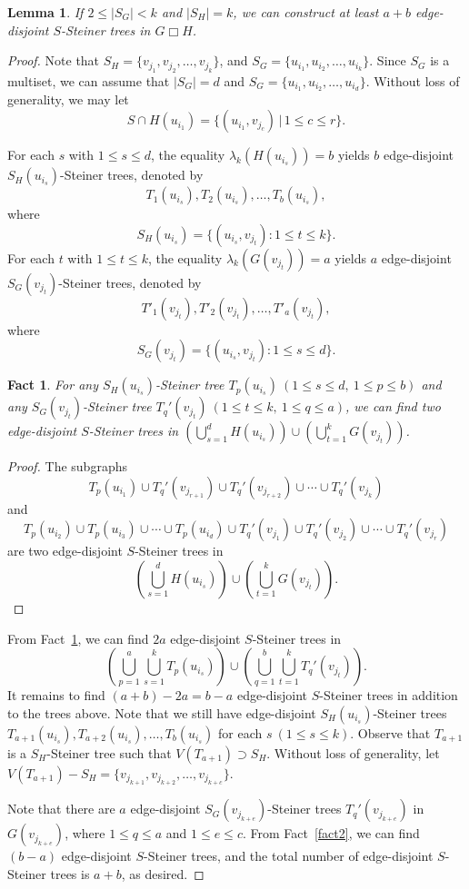 \documentclass[final]{dmtcs-episciences}
\newtheorem{lemma}{Lemma}[section]
\newtheorem{fact}{Fact}
\begin{document}
\begin{lemma}\label{lem2-3}
If $2\leq |S_G|<k$ and $|S_H|=k$, we can construct at
least $a+b$ edge-disjoint $S$-Steiner trees in $G\Box H$.
\end{lemma}

\begin{proof}
Note that $S_H=\{v_{j_1},v_{j_2},\ldots,v_{j_k}\}$, and
$S_G=\{u_{i_1},u_{i_2},\ldots,u_{i_k}\}$. Since $S_G$ is a
multiset, we can assume that $|S_G|=d$ and
$S_G=\{u_{i_1},u_{i_2},\ldots,u_{i_d}\}$. Without loss of
generality, we may let
\[
S\cap H(u_{i_1})=\{(u_{i_1},v_{j_c})\,|\,1\leq c\leq r\}.
\]

For each $s$ with $1\leq s\leq d$, the equality
$\lambda_k(H(u_{i_s}))=b$ yields $b$ edge-disjoint
$S_H(u_{i_s})$-Steiner trees, denoted by
\[
T_1(u_{i_s}),T_2(u_{i_s}),\ldots,T_b(u_{i_s}),
\]
where
\[
S_H(u_{i_s})=\{(u_{i_s},v_{j_t}):1\leq t\leq k\}.
\]
For each $t$ with $1\leq t\leq k$, the equality
$\lambda_k(G(v_{j_t}))=a$ yields $a$ edge-disjoint
$S_G(v_{j_t})$-Steiner trees, denoted by
\[
T'_1(v_{j_t}),T'_2(v_{j_t}),\ldots,T'_a(v_{j_t}),
\]
where
\[
S_G(v_{j_t})=\{(u_{i_s},v_{j_t}):1\leq s\leq d\}.
\]

\begin{fact}\label{fact4}
For any $S_H(u_{i_s})$-Steiner tree $T_p(u_{i_s}) \ (1\leq s\leq d,
\ 1\leq p\leq b)$ and any $S_G(v_{j_t})$-Steiner tree $T_q'(v_{j_t})
\ (1\leq t\leq k, \ 1\leq q\leq a)$, we can find two edge-disjoint
$S$-Steiner trees in $(\bigcup_{s=1}^dH(u_{i_s}))\cup
(\bigcup_{t=1}^kG(v_{j_t}))$.
\end{fact}
\begin{proof}
The subgraphs
\[
T_p(u_{i_1})\cup T_q'(v_{j_{r+1}})\cup T_q'(v_{j_{r+2}})
 \cup\cdots\cup T_q'(v_{j_k})
\]
and
\[
T_p(u_{i_2})\cup T_p(u_{i_3})\cup\cdots\cup T_p(u_{i_d})
 \cup T_q'(v_{j_1})\cup T_q'(v_{j_2})\cup\cdots\cup T_q'(v_{j_r})
\]
are two edge-disjoint $S$-Steiner trees in
\[
\left(\bigcup_{s=1}^d H(u_{i_s})\right)
 \cup \left(\bigcup_{t=1}^k G(v_{j_t})\right).
\]
\end{proof}

From Fact~\ref{fact4}, we can find $2a$ edge-disjoint $S$-Steiner
trees in
\[
\left(\bigcup_{p=1}^{a}\bigcup_{s=1}^kT_p(u_{i_s})\right)\cup
\left(\bigcup_{q=1}^{b}\bigcup_{t=1}^kT_q'(v_{j_t})\right).
\]
It remains to find $(a+b)-2a=b-a$ edge-disjoint $S$-Steiner trees
in addition to the trees above. Note that we still have edge-disjoint
$S_H(u_{i_s})$-Steiner trees
$T_{a+1}(u_{i_s}),T_{a+2}(u_{i_s}),\ldots,T_{b}(u_{i_s})$ for each
$s \ (1\leq s\leq k)$. Observe that $T_{a+1}$ is a $S_H$-Steiner
tree such that $V(T_{a+1})\supset S_H$. Without loss of generality,
let $V(T_{a+1})-S_H=\{v_{j_{k+1}},v_{j_{k+2}},\ldots,v_{j_{k+c}}\}$.

Note that there are $a$ edge-disjoint $S_G(v_{j_{k+e}})$-Steiner
trees $T_q'(v_{j_{k+e}})$ in $G(v_{j_{k+e}})$, where $1\leq q\leq a$
and $1\leq e\leq c$. From Fact~\ref{fact2}, we can find $(b-a)$
edge-disjoint $S$-Steiner trees, and the total number of
edge-disjoint $S$-Steiner trees is $a+b$, as desired.
\end{proof}
\end{document}
